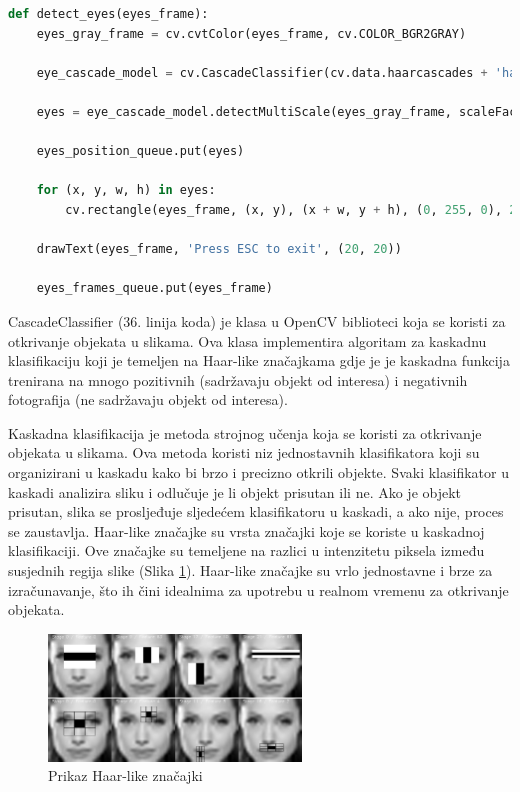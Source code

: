 \documentclass{foi}
\begin{document}
\begin{lstlisting}[language=Python, label={lst:lstlisting_9}, firstnumber=33, style=colored, caption={Definicija funkcije $detect\_eyes()$}]
def detect_eyes(eyes_frame):
    eyes_gray_frame = cv.cvtColor(eyes_frame, cv.COLOR_BGR2GRAY)

    eye_cascade_model = cv.CascadeClassifier(cv.data.haarcascades + 'haarcascade_eye.xml')

    eyes = eye_cascade_model.detectMultiScale(eyes_gray_frame, scaleFactor=1.1, minNeighbors=5, minSize=(30, 30))

    eyes_position_queue.put(eyes)

    for (x, y, w, h) in eyes:
        cv.rectangle(eyes_frame, (x, y), (x + w, y + h), (0, 255, 0), 2)

    drawText(eyes_frame, 'Press ESC to exit', (20, 20))

    eyes_frames_queue.put(eyes_frame)
\end{lstlisting}

CascadeClassifier (36. linija koda) je klasa u OpenCV biblioteci koja se koristi za otkrivanje objekata u slikama. Ova klasa implementira algoritam za kaskadnu klasifikaciju koji je temeljen na Haar-like značajkama gdje je je kaskadna funkcija trenirana na mnogo pozitivnih (sadržavaju objekt od interesa) i negativnih fotografija (ne sadržavaju objekt od interesa). \cite{OpenCV5}

Kaskadna klasifikacija je metoda strojnog učenja koja se koristi za otkrivanje objekata u slikama. Ova metoda koristi niz jednostavnih klasifikatora koji su organizirani u kaskadu kako bi brzo i precizno otkrili objekte. Svaki klasifikator u kaskadi analizira sliku i odlučuje je li objekt prisutan ili ne. Ako je objekt prisutan, slika se prosljeđuje sljedećem klasifikatoru u kaskadi, a ako nije, proces se zaustavlja. Haar-like značajke su vrsta značajki koje se koriste u kaskadnoj klasifikaciji. Ove značajke su temeljene na razlici u intenzitetu piksela između susjednih regija slike (Slika \ref{fig:haar_casc}). Haar-like značajke su vrlo jednostavne i brze za izračunavanje, što ih čini idealnima za upotrebu u realnom vremenu za otkrivanje objekata. \cite{KhanTanw2019}

\begin{figure}[h!]
    \centering
    \includegraphics[width=0.6\textwidth]{slike/haar_cascade}
    \caption{Prikaz Haar-like značajki \cite{OpenCV-haar}}
    \label{fig:haar_casc}
\end{figure}
\end{document}
